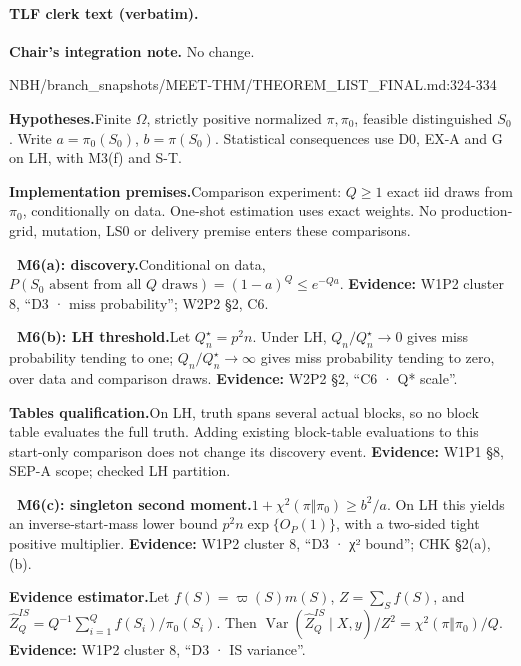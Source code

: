 \paragraph{TLF clerk text (verbatim).}
\par\noindent \textbf{Chair's integration note.} No change.

\begin{stmt}{NBH/branch_snapshots/MEET-THM/THEOREM_LIST_FINAL.md:324-334}
\par\smallskip\noindent\textbf{Hypotheses.}\enspace Finite \(\Omega\), strictly positive normalized \(\pi,\pi_0\), feasible distinguished \(S_0\). Write \(a=\pi_0(S_0)\), \(b=\pi(S_0)\). Statistical consequences use D0, EX-A and G on LH, with M3(f) and S-T.
\par\smallskip\noindent\textbf{Implementation premises.}\enspace Comparison experiment: \(Q\ge1\) exact iid draws from \(\pi_0\), conditionally on data. One-shot estimation uses exact weights. No production-grid, mutation, LS0 or delivery premise enters these comparisons.
\par\smallskip\noindent\textbf{\ M6(a): discovery.}\enspace Conditional on data, \(P(S_0\text{ absent from all }Q\text{ draws})=(1-a)^Q\le e^{-Qa}\). \textbf{Evidence:} W1P2 cluster 8, “D3 · miss probability”; W2P2 §2, C6.
\par\smallskip\noindent\textbf{\ M6(b): LH threshold.}\enspace Let \(Q_n^\star=p^2n\). Under LH, \(Q_n/Q_n^\star\to0\) gives miss probability tending to one; \(Q_n/Q_n^\star\to\infty\) gives miss probability tending to zero, over data and comparison draws. \textbf{Evidence:} W2P2 §2, “C6 · Q* scale”.
\par\smallskip\noindent\textbf{Tables qualification.}\enspace On LH, truth spans several actual blocks, so no block table evaluates the full truth. Adding existing block-table evaluations to this start-only comparison does not change its discovery event. \textbf{Evidence:} W1P1 §8, SEP-A scope; checked LH partition.
\par\smallskip\noindent\textbf{\ M6(c): singleton second moment.}\enspace \(1+\chi^2(\pi\Vert\pi_0)\ge b^2/a\). On LH this yields an inverse-start-mass lower bound \(p^2n\exp\{O_P(1)\}\), with a two-sided tight positive multiplier. \textbf{Evidence:} W1P2 cluster 8, “D3 · χ² bound”; CHK §2(a),(b).
\par\smallskip\noindent\textbf{Evidence estimator.}\enspace Let \(f(S)=\varpi(S)m(S)\), \(Z=\sum_Sf(S)\), and \(\widehat Z_Q^{IS}=Q^{-1}\sum_{i=1}^Qf(S_i)/\pi_0(S_i)\). Then \(\operatorname{Var}(\widehat Z_Q^{IS}\mid X,y)/Z^2=\chi^2(\pi\Vert\pi_0)/Q\). \textbf{Evidence:} W1P2 cluster 8, “D3 · IS variance”.

\end{stmt}
